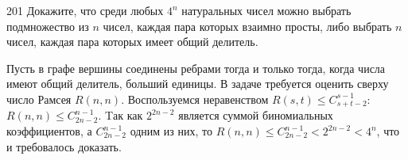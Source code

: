 \begin{task}{201}
Докажите, что среди любых $4^n$ натуральных чисел можно выбрать подмножество из $n$ чисел, каждая пара которых взаимно просты, либо выбрать $n$ чисел, каждая пара которых имеет общий делитель.
\end{task}
\begin{solution}
Пусть в графе вершины соединены ребрами тогда и только тогда, когда числа имеют общий делитель, больший единицы. В задаче требуется оценить сверху число Рамсея $R(n, n)$. Воспользуемся неравенством $R(s,t)\leq C_{s+t-2}^{s-1}$: $R(n,n)\leq C_{2n-2}^{n-1}$. Tак как $2^{2n-2}$ является суммой биномиальных коэффициентов, а $C_{2n-2}^{n-1}$ одним из них, то $R(n,n)\leq C_{2n-2}^{n-1}<2^{2n-2}<4^n$, что и требовалось доказать.
\end{solution}